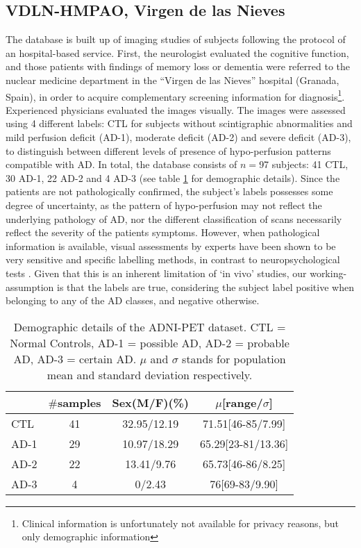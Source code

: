 \subsection{VDLN-HMPAO, Virgen de las Nieves}\label{sec:vdlnhmpao}
The database is built up of imaging studies of subjects following the protocol of an hospital-based service. First, the neurologist evaluated the cognitive function, and those patients with findings of memory loss or dementia were referred to the nuclear medicine department in the ``Virgen de las Nieves'' hospital (Granada, Spain), in order to acquire complementary screening information for diagnosis\footnote{Clinical information is unfortunately not available for privacy reasons, but only demographic  information}. Experienced physicians evaluated the images visually. The images were assessed using 4 different labels: \ac{CTL} for subjects without scintigraphic abnormalities and mild perfusion deficit (\ac{AD}-1), moderate deficit (\ac{AD}-2) and severe deficit (\ac{AD}-3), to distinguish between different levels of presence of hypo-perfusion patterns compatible with \ac{AD}. In total, the database consists of $n=$97 subjects: 41 \ac{CTL}, 30 \ac{AD}-1, 22 \ac{AD}-2 and 4 \ac{AD}-3 (see table \ref{tab:bd} for demographic details). Since the patients are not pathologically confirmed, the subject's labels possesses some degree of uncertainty, as the pattern of hypo-perfusion may not reflect the underlying pathology of AD, nor the different classification of scans necessarily reflect the severity of the patients symptoms. However, when pathological information is available, visual assessments by experts have been shown to be very sensitive and specific labelling methods, in contrast to neuropsychological tests \cite{jobst_accurate_1998,dougall_systematic_2004}. Given that this is an inherent limitation of `in vivo' studies, our working-assumption is that the labels are true, considering the subject label positive when belonging to any of the \ac{AD} classes, and negative otherwise. 

\begin{table}
	\begin{center}
		\begin{tabular}{lccc}
			\toprule
			          & $\#$samples & Sex(M/F)(\%) & $\mu$[range/$\sigma$] \\ 
			          \midrule
			\ac{CTL}  &     41      & 32.95/12.19  &     71.51[46-85/7.99] \\
			\ac{AD}-1 &     29      & 10.97/18.29  &    65.29[23-81/13.36] \\
			\ac{AD}-2 &     22      &  13.41/9.76  &     65.73[46-86/8.25] \\
			\ac{AD}-3 &      4      &    0/2.43    &        76[69-83/9.90] \\ 
			\bottomrule
		\end{tabular}
		\caption[Demographic details of the ADNI-PET dataset.]{Demographic details of the ADNI-PET dataset. \ac{CTL} = Normal Controls, \ac{AD}-1 = possible \ac{AD}, \ac{AD}-2 = probable \ac{AD}, \ac{AD}-3 = certain \ac{AD}. $\mu$ and $\sigma$ stands for population mean and standard deviation respectively.}
		\label{tab:bd}
	\end{center}
\end{table}

